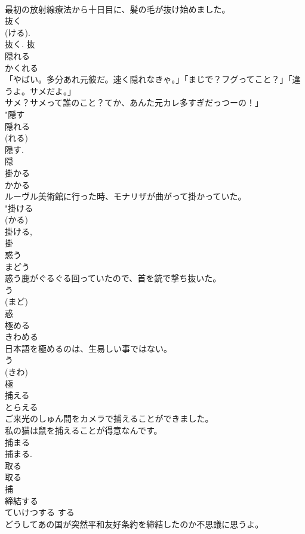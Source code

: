\documentclass[8pt]{extreport}
\begin{document}
\begin{CJK}{UTF8}{min}
\\	最初の放射線療法から十日目に、髪の毛が抜け始めました。	
\\	抜く 
\\	(ける).
\\	抜く.	抜	
\\	隠れる	
\\	かくれる	
\\	「やばい。多分あれ元彼だ。速く隠れなきゃ。」「まじで？フグってこと？」「違うよ。サメだよ。」
\\	サメ？サメって誰のこと？てか、あんた元カレ多すぎだっつーの！」	
\\	"隠す 
\\	隠れる 
\\	(れる) 
\\	隠す. 
\\	隠	
\\	掛かる	
\\	かかる	
\\	ルーヴル美術館に行った時、モナリザが曲がって掛かっていた。	
\\	"掛ける 
\\	(かる) 
\\	掛ける, 
\\	掛	
\\	惑う	
\\	まどう	
\\	惑う鹿がぐるぐる回っていたので、首を銃で撃ち抜いた。	
\\	う 
\\	(まど) 
\\	惑	
\\	極める	
\\	きわめる	
\\	日本語を極めるのは、生易しい事ではない。	
\\	う 
\\	(きわ) 
\\	極	
\\	捕える	
\\	とらえる	
\\	ご来光のしゅん間をカメラで捕えることができました。	
\\	私の猫は鼠を捕えることが得意なんです。	
\\	捕まる 
\\	捕まる. 
\\	取る 
\\	取る 
\\	捕	
\\	締結する	
\\	ていけつする	する 
\\	どうしてあの国が突然平和友好条約を締結したのか不思議に思うよ。	

\end{CJK}
\end{document}
